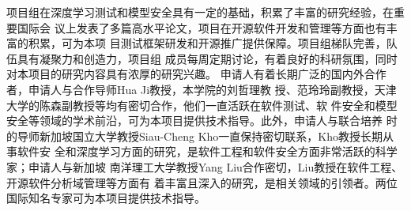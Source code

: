项目组在深度学习测试和模型安全具有一定的基础，积累了丰富的研究经验，在重要国际会
议上发表了多篇高水平论文，项目在开源软件开发和管理等方面也有丰富的积累，可为本项
目测试框架研发和开源推广提供保障。项目组梯队完善，队伍具有凝聚力和创造力，项目组
成员每周定期讨论，有着良好的科研氛围，同时对本项目的研究内容具有浓厚的研究兴趣。
申请人有着长期广泛的国内外合作者，申请人与合作导师Hua Ji教授，本学院的刘哲理教
授、范玲玲副教授，天津大学的陈森副教授等均有密切合作，他们一直活跃在软件测试、软
件安全和模型安全等领域的学术前沿，可为本项目提供技术指导。此外，申请人与联合培养
时的导师新加坡国立大学教授Siau-Cheng Kho一直保持密切联系，Kho教授长期从事软件安
全和深度学习方面的研究，是软件工程和软件安全方面非常活跃的科学家；申请人与新加坡
南洋理工大学教授Yang Liu合作密切，Liu教授在软件工程、开源软件分析域管理等方面有
着丰富且深入的研究，是相关领域的引领者。两位国际知名专家可为本项目提供技术指导。
\fi